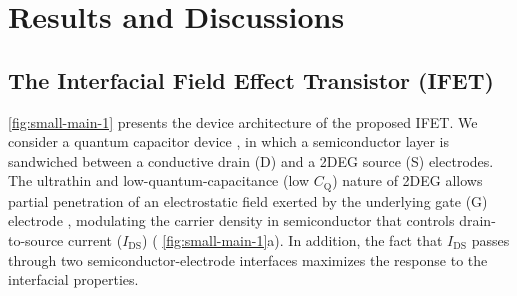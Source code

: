 \section{Results and Discussions}
\label{sec:small-results-discussions}


\subsection{The Interfacial Field Effect Transistor (IFET)}
\label{sec:small-interf-field-effect}

 \autoref{fig:small-main-1} presents the device architecture of the proposed
IFET. We consider a quantum capacitor device \cite{Luryi_1988_Quantum}, in which
a semiconductor layer is sandwiched between a conductive drain (D) and
a 2DEG source (S) electrodes. The ultrathin and
low-quantum-capacitance (low \(C_{\mathrm{Q}}\)) nature of 2DEG allows
partial penetration of an electrostatic field exerted by the
underlying gate (G) electrode \cite{Shih_2015_PartiallyScreened} ,
modulating the carrier density in semiconductor that controls
drain-to-source current (\(I_{\mathrm{DS}}\)) (
\autoref{fig:small-main-1}a).  In addition, the fact that \(I_{\mathrm{DS}}\)
passes through two semiconductor-electrode interfaces maximizes the
response to the interfacial properties.

